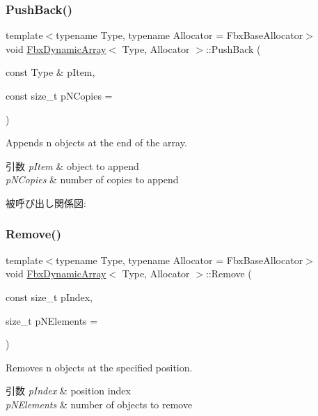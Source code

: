 \subsubsection{\texorpdfstring{Push\+Back()}{PushBack()}}
{\footnotesize\ttfamily template$<$typename Type, typename Allocator = Fbx\+Base\+Allocator$>$ \\
void \hyperlink{class_fbx_dynamic_array}{Fbx\+Dynamic\+Array}$<$ Type, Allocator $>$\+::Push\+Back (\begin{DoxyParamCaption}\item[{const Type \&}]{p\+Item,  }\item[{const size\+\_\+t}]{p\+N\+Copies = {} }\end{DoxyParamCaption})}

Appends n objects at the end of the array. 
\begin{DoxyParams}{引数}
{\em p\+Item} & object to append \\
\hline
{\em p\+N\+Copies} & number of copies to append \\
\hline
\end{DoxyParams}
被呼び出し関係図\+:
\mbox{\label{class_fbx_dynamic_array_abee89faf5555c293ff4332763b9234ba}} 
\subsubsection{\texorpdfstring{Remove()}{Remove()}}
{\footnotesize\ttfamily template$<$typename Type, typename Allocator = Fbx\+Base\+Allocator$>$ \\
void \hyperlink{class_fbx_dynamic_array}{Fbx\+Dynamic\+Array}$<$ Type, Allocator $>$\+::Remove (\begin{DoxyParamCaption}\item[{const size\+\_\+t}]{p\+Index,  }\item[{size\+\_\+t}]{p\+N\+Elements = {} }\end{DoxyParamCaption})}

Removes n objects at the specified position. 
\begin{DoxyParams}{引数}
{\em p\+Index} & position index \\
\hline
{\em p\+N\+Elements} & number of objects to remove \\
\hline
\end{DoxyParams}
\mbox{\label{class_fbx_dynamic_array_a056d5da710401c88f5c92fb5d77c725d}} 
